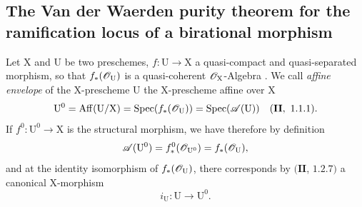 \subsection{The Van der Waerden purity theorem for the ramification locus of a birational morphism}
\label{subsection:IV.21.12}
\label{IV.21.12}

\begin{env}[21.12.1]
\label{IV.21.12.1}
Let $\mathrm{X}$ and $\mathrm{U}$ be two preschemes, $f:\mathrm{U}\to\mathrm{X}$ a quasi-compact and quasi-separated morphism, so that $f_*(\mathscr{O}_{\mathrm{U}})$ is a quasi-coherent $\mathscr{O}_{\mathrm{X}}$-Algebra .
We call \emph{affine envelope} of the $\mathrm{X}$-prescheme $\mathrm{U}$ the $\mathrm{X}$-prescheme affine over $\mathrm{X}$
\[
  \mathrm{U}^0=\operatorname{Aff}(\mathrm{U}/\mathrm{X})=\operatorname{Spec}(f_*(\mathscr{O}_{\mathrm{U}}))=\operatorname{Spec}(\mathscr{A}(\mathrm{U}))\quad(\mathbf{II},~1.1.1).
\]
If $f^0:\mathrm{U}^0\to\mathrm{X}$ is the structural morphism, we have therefore by definition
\[
  \mathscr{A}(\mathrm{U}^0)=f_*^0(\mathscr{O}_{\mathrm{U}^0})=f_*(\mathscr{O}_{\mathrm{U}}),
\]
and at the identity isomorphism of $f_*(\mathscr{O}_{\mathrm{U}})$, there corresponds by $(\mathbf{II}$, $1.2.7)$ a canonical $\mathrm{X}$-morphism
\[
\label{IV.21.12.1.1}
  i_{\mathrm{U}}:\mathrm{U}\to\mathrm{U}^0.
  \tag{21.12.1.1}
\]


\end{env}
